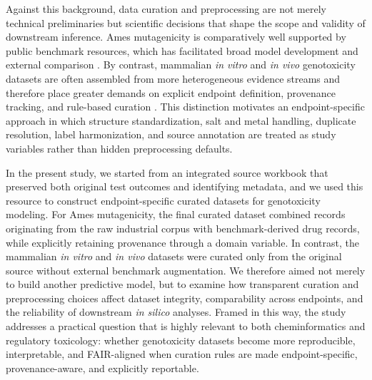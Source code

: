 Against this background, data curation and preprocessing are not merely technical preliminaries but scientific decisions 
that shape the scope and validity of downstream inference. Ames mutagenicity is comparatively well supported by public benchmark
resources, which has facilitated broad model development and external comparison \cite{Hansen2009}. 
By contrast, mammalian \textit{in vitro} and \textit{in vivo} genotoxicity datasets are often assembled from more 
heterogeneous evidence streams and therefore place greater demands on explicit endpoint definition, provenance tracking, 
and rule-based curation \cite{Nikolov2023,Raitano2026,COM2026}. This distinction motivates an endpoint-specific approach 
in which structure standardization, salt and metal handling, duplicate resolution, label harmonization, and source 
annotation are treated as study variables rather than hidden preprocessing defaults.

In the present study, we started from an integrated source workbook that preserved both original test outcomes and identifying metadata, and we used this resource to construct endpoint-specific curated datasets for genotoxicity modeling. For Ames mutagenicity, the final curated dataset combined records originating from the raw industrial corpus with benchmark-derived drug records, while explicitly retaining provenance through a domain variable. In contrast, the mammalian \textit{in vitro} and \textit{in vivo} datasets were curated only from the original source without external benchmark augmentation. We therefore aimed not merely to build another predictive model, but to examine how transparent curation and preprocessing choices affect dataset integrity, comparability across endpoints, and the reliability of downstream \textit{in silico} analyses. Framed in this way, the study addresses a practical question that is highly relevant to both cheminformatics and regulatory toxicology: whether genotoxicity datasets become more reproducible, interpretable, and FAIR-aligned when curation rules are made endpoint-specific, provenance-aware, and explicitly reportable.